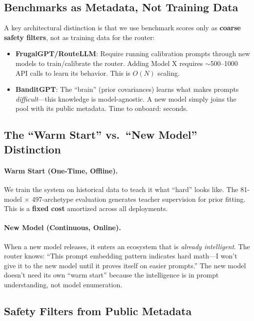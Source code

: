 \subsection{Benchmarks as Metadata, Not Training Data}

A key architectural distinction is that we use benchmark scores only as \textbf{coarse safety filters}, not as training data for the router:

\begin{itemize}[leftmargin=*]
    \item \textbf{FrugalGPT/RouteLLM}: Require running calibration prompts through new models to train/calibrate the router. Adding Model X requires $\sim$500--1000 API calls to learn its behavior. This is $O(N)$ scaling.
    
    \item \textbf{BanditGPT}: The ``brain'' (prior covariances) learns what makes prompts \emph{difficult}---this knowledge is model-agnostic. A new model simply joins the pool with its public metadata. Time to onboard: seconds.
\end{itemize}

\subsection{The ``Warm Start'' vs.\ ``New Model'' Distinction}

\paragraph{Warm Start (One-Time, Offline).} We train the system on historical data to teach it what ``hard'' looks like. The 81-model $\times$ 497-archetype evaluation generates teacher supervision for prior fitting. This is a \textbf{fixed cost} amortized across all deployments.

\paragraph{New Model (Continuous, Online).} When a new model releases, it enters an ecosystem that is \emph{already intelligent}. The router knows: ``This prompt embedding pattern indicates hard math---I won't give it to the new model until it proves itself on easier prompts.'' The new model doesn't need its own ``warm start'' because the intelligence is in prompt understanding, not model enumeration.

\subsection{Safety Filters from Public Metadata}

